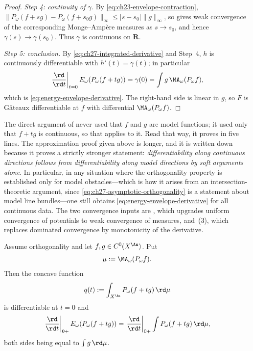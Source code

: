 \begin{proof}
\emph{Step 4: continuity of \(\gamma\).}
By \eqref{eq:ch23-envelope-contraction},
\(\lVert P_\omega(f+sg)-P_\omega(f+s_0g)\rVert_\infty
\leq|s-s_0|\lVert g\rVert_\infty\), so
 gives weak convergence of the corresponding
Monge--Amp\`ere measures as \(s\to s_0\), and hence
\(\gamma(s)\to\gamma(s_0)\).  Thus \(\gamma\) is continuous on
\(\mathbf R\).

\emph{Step 5: conclusion.}
By \eqref{eq:ch27-integrated-derivative} and Step~4, \(h\) is continuously
differentiable with \(h'(t)=\gamma(t)\); in particular
\[
 \left.\frac{\rd}{\rd t}\right|_{t=0}E_\omega(P_\omega(f+tg))
 =\gamma(0)=\int g\,\MA_\omega(P_\omega f),
\]
which is \eqref{eq:energy-envelope-derivative}.  The right-hand side is
linear in \(g\), so \(F\) is G\^ateaux differentiable at \(f\) with
differential \(\MA_\omega(P_\omega f)\).
\end{proof}

\begin{remark}
\label{rem:ch27-two-proofs}
The direct argument of
 never used that \(f\) and
\(g\) are model functions; it used only that \(f+tg\) is continuous, so that
 applies to it.  Read that way, it proves
 in five lines.  The
approximation proof given above is longer, and it is written down because it
proves a strictly stronger statement: \emph{differentiability along
continuous directions follows from differentiability along model directions
by soft arguments alone}.  In particular, in any situation where the
orthogonality property is established only for model obstacles---which is
how it arises from an intersection-theoretic argument, since
\eqref{eq:ch27-asymptotic-orthogonality} is a statement about model line
bundles---one still obtains
\eqref{eq:energy-envelope-derivative} for all continuous data.  The two
convergence inputs are , which upgrades uniform
convergence of potentials to weak convergence of measures, and
\,(3), which replaces dominated convergence by
monotonicity of the derivative.
\end{remark}

\begin{corollary}
\label{cor:ch27-linearization}
Assume orthogonality and let \(f,g\in C^0(X^{\An})\).  Put
\[
 \mu:=\MA_\omega(P_\omega f).
\]
Then the concave function
\[
 q(t):=\int_{X^{\An}}P_\omega(f+tg)\,\rd\mu
\]
is differentiable at \(t=0\) and
\begin{equation}\label{eq:linearized-envelope-energy}
 \left.\frac{\rd}{\rd t}\right|_{0+}E_\omega(P_\omega(f+tg))
 =
 \left.\frac{\rd}{\rd t}\right|_{0+}
 \int P_\omega(f+tg)\,\rd \mu ,
\end{equation}
both sides being equal to \(\int g\,\rd\mu\).
\end{corollary}


